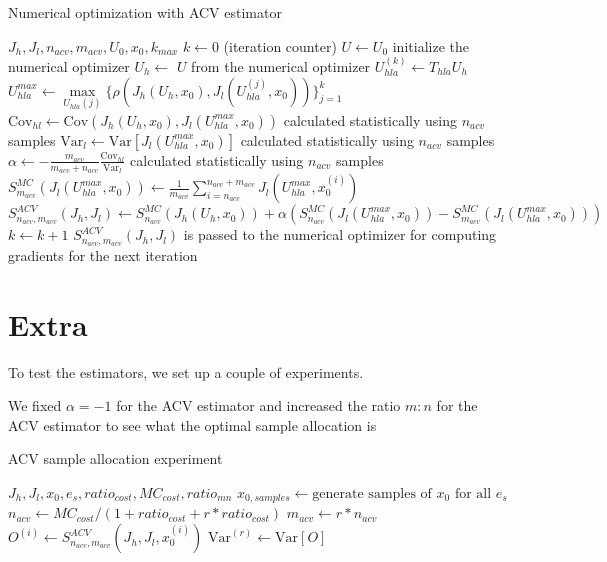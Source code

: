 \documentclass{article}
\begin{document}
\begin{algorithm}
  \caption{Numerical optimization with ACV estimator}
  \begin{algorithmic}
    \Require $J_h, J_l, n_{acv}, m_{acv}, U_0, x_0, k_{max}$
    \State $k \gets 0$ (iteration counter)
    \State $U \gets U_0$ initialize the numerical optimizer
    \State $U_h \gets$ $U$ from the numerical optimizer
    \State $U_{hla}^{(k)} \gets T_{hla} U_h$
    \State $U_{hla}^{max} \gets \underset{U_{hla}(j)} \max \{\rho(J_h(U_h, x_0), J_l(U_{hla}^{(j)}, x_0))\}_{j=1}^k$
    \State $\text{Cov}_{hl} \gets \text{Cov}(J_h(U_h, x_0), J_l(U_{hla}^{max}, x_0))$ calculated statistically using $n_{acv}$ samples
    \State $\text{Var}_l \gets \text{Var}[J_l(U_{hla}^{max}, x_0)]$ calculated statistically using $n_{acv}$ samples
    \State $\alpha \gets -\frac{m_{acv}}{m_{acv} + n_{acv}} \frac{\text{Cov}_{hl}}{\text{Var}_l}$ calculated statistically using $n_{acv}$ samples
    \State $S_{m_{acv}}^{MC}(J_l(U_{hla}^{max}, x_0)) \gets \frac{1}{m_{acv}} \sum_{i=n_{acv}}^{n_{acv}+m_{acv}} J_l(U_{hla}^{max}, x_0^{(i)})$
    \State $S_{n_{acv},m_{acv}}^{ACV}(J_h, J_l) \gets S_{n_{acv}}^{MC}(J_h(U_h, x_0)) + \alpha (S_{n_{acv}}^{MC}(J_l(U_{hla}^{max}, x_0)) - S_{m_{acv}}^{MC}(J_l(U_{hla}^{max}, x_0)))$
    \State $k \gets k + 1$
    \State $S_{n_{acv},m_{acv}}^{ACV}(J_h, J_l)$ is passed to the numerical optimizer for computing gradients for the next iteration
    \EndWhile
  \end{algorithmic}
\end{algorithm}

\section{Extra}
To test the estimators, we set up a couple of experiments.

We fixed $\alpha = -1$ for the ACV estimator and increased the ratio $m:n$ for the ACV estimator
to see what the optimal sample allocation is
\begin{algorithm}
  \caption{ACV sample allocation experiment}
  \begin{algorithmic}
    \Require $J_h, J_l, x_0, e_s, ratio_{cost}, MC_{cost}, ratio_{mn}$
    \State $x_{0,samples} \gets \text{generate samples of } x_0 \text{ for all } e_s$
    \State $n_{acv} \gets MC_{cost} / (1 + ratio_{cost} + r * ratio_{cost})$
    \State $m_{acv} \gets r * n_{acv}$
    \State $O^{(i)} \gets S_{n_{acv},m_{acv}}^{ACV}(J_h, J_l, x_0^{(i)})$
    \EndFor
    \State $\text{Var}^{(r)} \gets \text{Var}[O]$
    \EndFor
  \end{algorithmic}
\end{algorithm}
\end{document}
